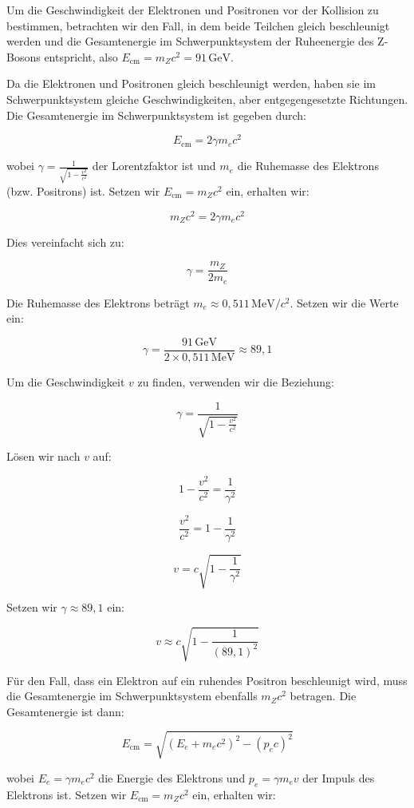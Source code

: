 Um die Geschwindigkeit der Elektronen und Positronen vor der Kollision zu bestimmen, betrachten wir den Fall, in dem beide Teilchen gleich beschleunigt werden und die Gesamtenergie im Schwerpunktsystem der Ruheenergie des Z-Bosons entspricht, also \( E_{\text{cm}} = m_Z c^2 = 91 \, \text{GeV} \).

Da die Elektronen und Positronen gleich beschleunigt werden, haben sie im Schwerpunktsystem gleiche Geschwindigkeiten, aber entgegengesetzte Richtungen. Die Gesamtenergie im Schwerpunktsystem ist gegeben durch:

\[
E_{\text{cm}} = 2 \gamma m_e c^2
\]

wobei \( \gamma = \frac{1}{\sqrt{1 - \frac{v^2}{c^2}}} \) der Lorentzfaktor ist und \( m_e \) die Ruhemasse des Elektrons (bzw. Positrons) ist. Setzen wir \( E_{\text{cm}} = m_Z c^2 \) ein, erhalten wir:

\[
m_Z c^2 = 2 \gamma m_e c^2
\]

Dies vereinfacht sich zu:

\[
\gamma = \frac{m_Z}{2 m_e}
\]

Die Ruhemasse des Elektrons beträgt \( m_e \approx 0{,}511 \, \text{MeV}/c^2 \). Setzen wir die Werte ein:

\[
\gamma = \frac{91 \, \text{GeV}}{2 \times 0{,}511 \, \text{MeV}} \approx 89{,}1
\]

Um die Geschwindigkeit \( v \) zu finden, verwenden wir die Beziehung:

\[
\gamma = \frac{1}{\sqrt{1 - \frac{v^2}{c^2}}}
\]

Lösen wir nach \( v \) auf:

\[
1 - \frac{v^2}{c^2} = \frac{1}{\gamma^2}
\]

\[
\frac{v^2}{c^2} = 1 - \frac{1}{\gamma^2}
\]

\[
v = c \sqrt{1 - \frac{1}{\gamma^2}}
\]

Setzen wir \( \gamma \approx 89{,}1 \) ein:

\[
v \approx c \sqrt{1 - \frac{1}{(89{,}1)^2}}
\]

Für den Fall, dass ein Elektron auf ein ruhendes Positron beschleunigt wird, muss die Gesamtenergie im Schwerpunktsystem ebenfalls \( m_Z c^2 \) betragen. Die Gesamtenergie ist dann:

\[
E_{\text{cm}} = \sqrt{(E_e + m_e c^2)^2 - (p_e c)^2}
\]

wobei \( E_e = \gamma m_e c^2 \) die Energie des Elektrons und \( p_e = \gamma m_e v \) der Impuls des Elektrons ist. Setzen wir \( E_{\text{cm}} = m_Z c^2 \) ein, erhalten wir:

